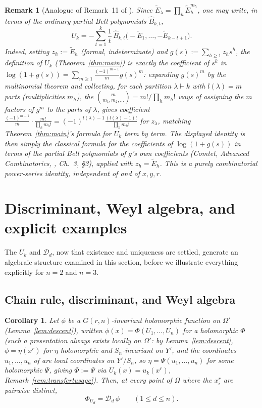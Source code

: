 \documentclass[10pt,a4paper]{amsart}
\newtheorem{corollary}[theorem]{Corollary}
\newtheorem{remark}[theorem]{Remark}
\begin{document}
\begin{remark}[Analogue of Remark~11 of \cite{Ze}]
Since $\widetilde E_\lambda=\prod_h \widetilde E_h^{m_h}$, one may write, in terms of the ordinary partial Bell polynomials $\hat B_{k,t}$,
\[
U_k = -\sum_{t=1}^{k} \frac{1}{t}\,\hat B_{k,t}\big(-\widetilde E_1,\dots,-\widetilde E_{k-t+1}\big).
\]
Indeed, setting $z_h:=\widetilde E_h$ (formal, indeterminate) and $g(s):=\sum_{h\ge1}z_hs^h$, the definition of $U_k$ (Theorem~\ref{thm:main}) is exactly the coefficient of $s^k$ in $\log(1+g(s))=\sum_{m\ge1}\frac{(-1)^{m-1}}{m}g(s)^m$: expanding $g(s)^m$ by the multinomial theorem and collecting, for each partition $\lambda\vdash k$ with $l(\lambda)=m$ parts (multiplicities $m_h$), the $\binom{m}{m_1,m_2,\dots}=m!/\prod_hm_h!$ ways of assigning the $m$ factors of $g^m$ to the parts of $\lambda$, gives coefficient $\frac{(-1)^{m-1}}{m}\cdot\frac{m!}{\prod_hm_h!}=(-1)^{l(\lambda)-1}\frac{(l(\lambda)-1)!}{\prod_hm_h!}$ for $z_\lambda$, matching Theorem~\ref{thm:main}'s formula for $U_k$ term by term. The displayed identity is then simply the classical formula for the coefficients of $\log(1+g(s))$ in terms of the partial Bell polynomials of $g$'s own coefficients (Comtet, \emph{Advanced Combinatorics}, \cite{Comtet}, Ch.~3, \S3), applied with $z_h=\widetilde E_h$. This is a purely combinatorial power-series identity, independent of \cite{Ze} and of $x,y,r$.
\end{remark}

\section{Discriminant, Weyl algebra, and explicit examples}

The $U_k$ and $\mathcal D_d$, now that existence and uniqueness are settled, generate an algebraic structure examined in this section, before we illustrate everything explicitly for $n=2$ and $n=3$.

\subsection{Chain rule, discriminant, and Weyl algebra}

\begin{corollary}\label{cor:cor12}
Let $\phi$ be a $G(r,n)$-invariant holomorphic function on $\Omega'$ (Lemma~\ref{lem:descent}), written $\phi(x)=\Phi(U_1,\dots,U_n)$ for a holomorphic $\Phi$ (such a presentation always exists locally on $\Omega'$: by Lemma~\ref{lem:descent}, $\phi=\eta(x^r)$ for $\eta$ holomorphic and $S_n$-invariant on $Y'$, and the coordinates $u_1,\dots,u_n$ of \cite{Ze} are local coordinates on $Y'/S_n$, so $\eta=\Psi(u_1,\dots,u_n)$ for some holomorphic $\Psi$, giving $\Phi:=\Psi$ via $U_k(x)=u_k(x^r)$, Remark~\ref{rem:transfertusage}). Then, at every point of $\Omega$ where the $x_i^r$ are pairwise distinct,
\[
\Phi_{U_d} = \mathcal D_d\,\phi \qquad (1\le d\le n).
\]
\end{corollary}
\end{document}
